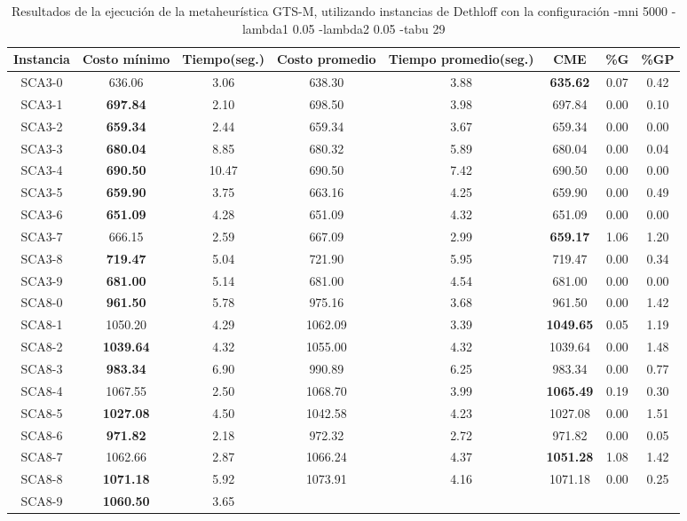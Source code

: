 \begin{table}[h]
\caption{Resultados de la ejecución de la metaheurística GTS-M, utilizando instancias de Dethloff con la configuración -mni 5000 -lambda1 0.05 -lambda2 0.05 -tabu 29}
\centering
\small
\begin{tabular}{c c c c c c c c}
\hline\hline
Instancia & Costo mínimo & Tiempo(seg.) & Costo promedio & Tiempo promedio(seg.) & CME & \%G & \%GP \\ [0.5ex]
\hline
SCA3-0 & 636.06 & 3.06 & 
638.30 & 3.88 & \bf{635.62} & 
0.07 & 0.42\\SCA3-1 & \bf{697.84} & 2.10 & 
698.50 & 3.98 & 697.84 & 0.00
 & 0.10\\SCA3-2 & \bf{659.34} & 2.44 & 
659.34 & 3.67 & 659.34 & 0.00
 & 0.00\\
SCA3-3 & \bf{680.04} & 8.85 & 
680.32 & 5.89 & 680.04 & 0.00
 & 0.04\\SCA3-4 & \bf{690.50} & 10.47 & 
690.50 & 7.42 & 690.50 & 0.00
 & 0.00\\
SCA3-5 & \bf{659.90} & 3.75 & 
663.16 & 4.25 & 659.90 & 0.00
 & 0.49\\SCA3-6 & \bf{651.09} & 4.28 & 
651.09 & 4.32 & 651.09 & 0.00
 & 0.00\\
SCA3-7 & 666.15 & 2.59 & 
667.09 & 2.99 & \bf{659.17} & 
1.06 & 1.20\\SCA3-8 & \bf{719.47} & 5.04 & 
721.90 & 5.95 & 719.47 & 0.00
 & 0.34\\SCA3-9 & \bf{681.00} & 5.14 & 
681.00 & 4.54 & 681.00 & 0.00
 & 0.00\\
SCA8-0 & \bf{961.50} & 5.78 & 
975.16 & 3.68 & 961.50 & 0.00
 & 1.42\\SCA8-1 & 1050.20 & 4.29 & 
1062.09 & 3.39 & \bf{1049.65} & 
0.05 & 1.19\\SCA8-2 & \bf{1039.64} & 4.32 & 
1055.00 & 4.32 & 1039.64 & 0.00
 & 1.48\\SCA8-3 & \bf{983.34} & 6.90 & 
990.89 & 6.25 & 983.34 & 0.00
 & 0.77\\SCA8-4 & 1067.55 & 2.50 & 
1068.70 & 3.99 & \bf{1065.49} & 
0.19 & 0.30\\SCA8-5 & \bf{1027.08} & 4.50 & 
1042.58 & 4.23 & 1027.08 & 0.00
 & 1.51\\SCA8-6 & \bf{971.82} & 2.18 & 
972.32 & 2.72 & 971.82 & 0.00
 & 0.05\\SCA8-7 & 1062.66 & 2.87 & 
1066.24 & 4.37 & \bf{1051.28} & 
1.08 & 1.42\\SCA8-8 & \bf{1071.18} & 5.92 & 
1073.91 & 4.16 & 1071.18 & 0.00
 & 0.25\\SCA8-9 & \bf{1060.50} & 3.65 & 

\end{tabular}
\end{table}
